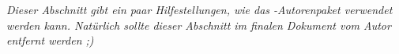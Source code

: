 

\begin{center}\itshape
Dieser Abschnitt gibt ein paar Hilfestellungen, wie das \nipajin-Autorenpaket verwendet werden kann. Natürlich sollte dieser Abschnitt im finalen Dokument vom Autor entfernt werden ;)
\end{center}

